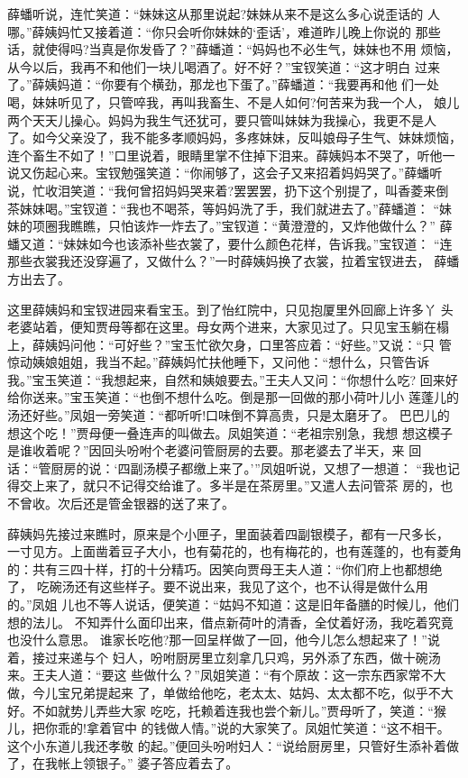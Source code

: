 薛蟠听说，连忙笑道：“妹妹这从那里说起?妹妹从来不是这么多心说歪话的
人哪。”薛姨妈忙又接着道：“你只会听你妹妹的‘歪话’，难道昨儿晚上你说的
那些话，就使得吗?当真是你发昏了？”薛蟠道：“妈妈也不必生气，妹妹也不用
烦恼，从今以后，我再不和他们一块儿喝酒了。好不好？”宝钗笑道：“这才明白
过来了。”薛姨妈道：“你要有个横劲，那龙也下蛋了。”薛蟠道：“我要再和他
们一处喝，妹妹听见了，只管啐我，再叫我畜生、不是人如何?何苦来为我一个人，
娘儿两个天天儿操心。妈妈为我生气还犹可，要只管叫妹妹为我操心，我更不是人
了。如今父亲没了，我不能多孝顺妈妈，多疼妹妹，反叫娘母子生气、妹妹烦恼，
连个畜生不如了！”口里说着，眼睛里掌不住掉下泪来。薛姨妈本不哭了，听他一
说又伤起心来。宝钗勉强笑道：“你闹够了，这会子又来招着妈妈哭了。”薛蟠听
说，忙收泪笑道：“我何曾招妈妈哭来着?罢罢罢，扔下这个别提了，叫香菱来倒
茶妹妹喝。”宝钗道：“我也不喝茶，等妈妈洗了手，我们就进去了。”薛蟠道：
“妹妹的项圈我瞧瞧，只怕该炸一炸去了。”宝钗道：“黄澄澄的，又炸他做什么？”
薛蟠又道：“妹妹如今也该添补些衣裳了，要什么颜色花样，告诉我。”宝钗道：
“连那些衣裳我还没穿遍了，又做什么？”一时薛姨妈换了衣裳，拉着宝钗进去，
薛蟠方出去了。

这里薛姨妈和宝钗进园来看宝玉。到了怡红院中，只见抱厦里外回廊上许多丫
头老婆站着，便知贾母等都在这里。母女两个进来，大家见过了。只见宝玉躺在榻
上，薛姨妈问他：“可好些？”宝玉忙欲欠身，口里答应着：“好些。”又说：“只
管惊动姨娘姐姐，我当不起。”薛姨妈忙扶他睡下，又问他：“想什么，只管告诉
我。”宝玉笑道：“我想起来，自然和姨娘要去。”王夫人又问：“你想什么吃?
回来好给你送来。”宝玉笑道：“也倒不想什么吃。倒是那一回做的那小荷叶儿小
莲蓬儿的汤还好些。”凤姐一旁笑道：“都听听!口味倒不算高贵，只是太磨牙了。
巴巴儿的想这个吃！”贾母便一叠连声的叫做去。凤姐笑道：“老祖宗别急，我想
想这模子是谁收着呢？”因回头吩咐个老婆问管厨房的去要。那老婆去了半天，来
回话：“管厨房的说：‘四副汤模子都缴上来了。’”凤姐听说，又想了一想道：
“我也记得交上来了，就只不记得交给谁了。多半是在茶房里。”又遣人去问管茶
房的，也不曾收。次后还是管金银器的送了来了。

薛姨妈先接过来瞧时，原来是个小匣子，里面装着四副银模子，都有一尺多长，
一寸见方。上面凿着豆子大小，也有菊花的，也有梅花的，也有莲蓬的，也有菱角
的：共有三四十样，打的十分精巧。因笑向贾母王夫人道：“你们府上也都想绝了，
吃碗汤还有这些样子。要不说出来，我见了这个，也不认得是做什么用的。”凤姐
儿也不等人说话，便笑道：“姑妈不知道：这是旧年备膳的时候儿，他们想的法儿。
不知弄什么面印出来，借点新荷叶的清香，全仗着好汤，我吃着究竟也没什么意思。
谁家长吃他?那一回呈样做了一回，他今儿怎么想起来了！”说着，接过来递与个
妇人，吩咐厨房里立刻拿几只鸡，另外添了东西，做十碗汤来。王夫人道：“要这
些做什么？”凤姐笑道：“有个原故：这一宗东西家常不大做，今儿宝兄弟提起来
了，单做给他吃，老太太、姑妈、太太都不吃，似乎不大好。不如就势儿弄些大家
吃吃，托赖着连我也尝个新儿。”贾母听了，笑道：“猴儿，把你乖的!拿着官中
的钱做人情。”说的大家笑了。凤姐忙笑道：“这不相干。这个小东道儿我还孝敬
的起。”便回头吩咐妇人：“说给厨房里，只管好生添补着做了，在我帐上领银子。”
婆子答应着去了。

